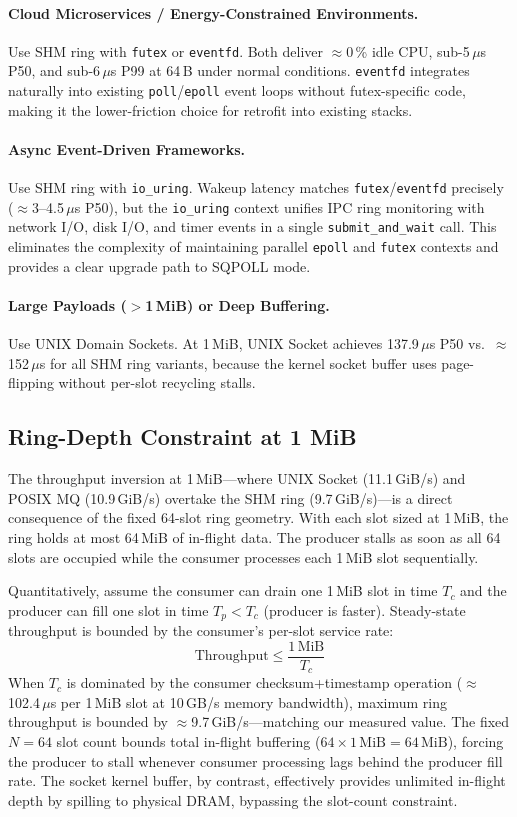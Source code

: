 \documentclass[10pt,conference]{IEEEtran}
\begin{document}
\paragraph{Cloud Microservices / Energy-Constrained Environments.}
Use SHM ring with \texttt{futex} or \texttt{eventfd}.  Both deliver
$\approx$0\,\% idle CPU, sub-5\,$\mu$s P50, and sub-6\,$\mu$s P99 at 64\,B
under normal conditions.  \texttt{eventfd} integrates naturally
into existing \texttt{poll}/\texttt{epoll} event loops without futex-specific
code, making it the lower-friction choice for retrofit into existing stacks.

\paragraph{Async Event-Driven Frameworks.}
Use SHM ring with \texttt{io\_uring}.  Wakeup latency matches
\texttt{futex}/\texttt{eventfd} precisely ($\approx$3--4.5\,$\mu$s P50), but
the \texttt{io\_uring} context unifies IPC ring monitoring with network I/O,
disk I/O, and timer events in a single \texttt{submit\_and\_wait} call.  This
eliminates the complexity of maintaining parallel \texttt{epoll} and
\texttt{futex} contexts and provides a clear upgrade path to SQPOLL mode.

\paragraph{Large Payloads ($>$1\,MiB) or Deep Buffering.}
Use UNIX Domain Sockets.  At 1\,MiB, UNIX Socket achieves 137.9\,$\mu$s P50
vs.\ $\approx$152\,$\mu$s for all SHM ring variants, because the kernel socket
buffer uses page-flipping without per-slot recycling stalls.

\subsection{Ring-Depth Constraint at 1 MiB}

The throughput inversion at 1\,MiB---where UNIX Socket (11.1\,GiB/s) and
POSIX MQ (10.9\,GiB/s) overtake the SHM ring (9.7\,GiB/s)---is a direct
consequence of the fixed 64-slot ring geometry.  With each slot sized at
1\,MiB, the ring holds at most 64\,MiB of in-flight data.  The producer stalls
as soon as all 64 slots are occupied while the consumer processes each 1\,MiB
slot sequentially.

Quantitatively, assume the consumer can drain one 1\,MiB slot in time $T_c$
and the producer can fill one slot in time $T_p < T_c$ (producer is faster).
Steady-state throughput is bounded by the consumer's per-slot service rate:
\[
  \text{Throughput} \leq \frac{1\,\text{MiB}}{T_c}
\]
When $T_c$ is dominated by the consumer checksum+timestamp operation
($\approx$102.4\,$\mu$s per 1\,MiB slot at 10\,GB/s memory bandwidth), maximum
ring throughput is bounded by $\approx$9.7\,GiB/s---matching our measured value.
The fixed $N = 64$ slot count bounds total in-flight buffering ($64 \times 1\,\text{MiB} = 64\,\text{MiB}$),
forcing the producer to stall whenever consumer processing lags behind the producer fill rate.
The socket kernel buffer, by contrast, effectively provides unlimited in-flight depth by spilling to physical DRAM, bypassing the slot-count constraint.
\end{document}
